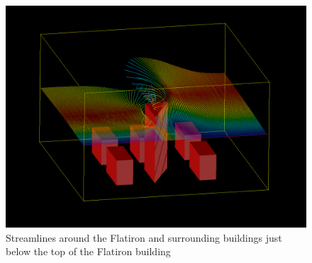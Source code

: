\begin{figure}[h]
\centering
\includegraphics[width = \textwidth]{streamlinestop.png}
\caption{Streamlines around the Flatiron and surrounding buildings just below the top of the Flatiron building}
\label{fig:streamlinestop}
\end{figure}\\